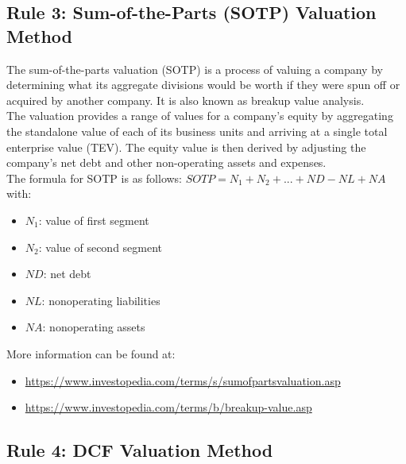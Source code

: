 \subsection{Rule 3: Sum-of-the-Parts (SOTP) Valuation Method}

The sum-of-the-parts valuation (SOTP) is a process of valuing a company by
determining what its aggregate divisions would be worth if they were spun off or
acquired by another company. It is also known as breakup value analysis.\\
The valuation provides a range of values for a company's equity by aggregating
the standalone value of each of its business units and arriving at a single
total enterprise value (TEV). The equity value is then derived by adjusting the
company's net debt and other non-operating assets and expenses.\\
The formula for SOTP is as follows: $SOTP = N_1 + N_2 + ... + ND - NL + NA$ with:
\begin{itemize}
    \item $N_1$: value of first segment
    \item $N_2$: value of second segment
    \item $ND$: net debt
    \item $NL$: nonoperating liabilities
    \item $NA$: nonoperating assets
\end{itemize}

More information can be found at:
\begin{itemize}
    \item \url{https://www.investopedia.com/terms/s/sumofpartsvaluation.asp}
    \item \url{https://www.investopedia.com/terms/b/breakup-value.asp}
\end{itemize}

\subsection{Rule 4: DCF Valuation Method}

